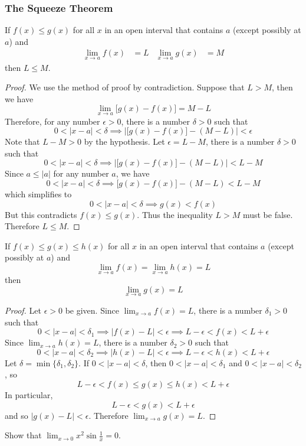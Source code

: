 \subsubsection*{The Squeeze Theorem}
\begin{theorem}
    If \(f(x)\leq g(x)\) for all \(x\) in an open interval that contains
    \(a\) (except possibly at \(a\)) and
    \begin{align*}
        \lim_{x\to a}f(x) &= L & \lim_{x\to a}g(x) &= M
    \end{align*}
    then \(L\leq M\).
\end{theorem}
\begin{proof}
    We use the method of proof by contradiction.
    Suppose  that \(L>M\),
    then we have
    \[\lim_{x\to a}\bigl[g(x)-f(x)\bigr]=M-L\]
    Therefore,
    for any number \(\epsilon>0\),
    there is a number \(\delta>0\) such that
    \[0<|x-a|<\delta\implies
    \left|\bigl[g(x)-f(x)\bigr]-(M-L)\right|<\epsilon\]
    Note that \(L-M>0\) by the hypothesis.
    Let \(\epsilon=L-M\),
    there is a number \(\delta>0\) such that
    \[0<|x-a|<\delta\implies\left|\bigl[g(x)-f(x)\bigr]-(M-L)\right|<L-M\]
    Since \(a\leq|a|\) for any number \(a\),
    we have
    \[0<|x-a|<\delta\implies \bigl[g(x)-f(x)\bigr]-(M-L)<L-M\]
    which simplifies to
    \[0<|x-a|<\delta\implies g(x)<f(x)\]
    But this contradicts \(f(x)\leq g(x)\).
    Thus the inequality \(L>M\) must be false.
    Therefore \(L\leq M\).
\end{proof}
\begin{theorem}
    If \(f(x)\leq g(x)\leq h(x)\) for all \(x\) in an open interval that
    contains \(a\) (except possibly at \(a\)) and
    \[\lim_{x\to a}f(x)=\lim_{x\to a}h(x)=L\]
    then
    \[\lim_{x\to a}g(x)=L\]
\end{theorem}
\begin{proof}
    Let \(\epsilon>0\) be given.
    Since \(\displaystyle{\lim_{x\to a}f(x)=L}\),
    there is a number \(\delta_1>0\) such that
    \[0<|x-a|<\delta_1\implies|f(x)-L|<\epsilon\implies L-\epsilon<f(x)
    <L+\epsilon\]
    Since \(\displaystyle{\lim_{x\to a}h(x)=L}\),
    there is a number \(\delta_2>0\) such that
    \[0<|x-a|<\delta_2\implies|h(x)-L|<\epsilon\implies L-\epsilon<h(x)
    <L+\epsilon\]
    Let \(\delta=\min\{\delta_1,\delta_2\}\).
    If \(0<|x-a|<\delta\),
    then \(0<|x-a|<\delta_1\) and \(0<|x-a|<\delta_2\),
    so
    \[L-\epsilon<f(x)\leq g(x)\leq h(x)<L+\epsilon\]
    In particular,
    \[L-\epsilon<g(x)<L+\epsilon\]
    and so \(|g(x)-L|<\epsilon\).
    Therefore \(\displaystyle{\lim_{x\to a}g(x)=L}\).
\end{proof}
\begin{problem}
    Show that
    \(\displaystyle{\lim_{x\to 0}x^2\sin\frac{1}{x}=0}\).
\end{problem}

